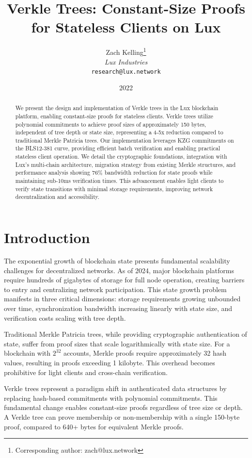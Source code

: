 \documentclass[11pt,a4paper]{article}
\title{\textbf{Verkle Trees: Constant-Size Proofs for Stateless Clients on Lux}}
\author{
Zach Kelling\thanks{Corresponding author: zach@lux.network}\\
\textit{Lux Industries}\\
\texttt{research@lux.network}
}
\date{2022}
\theoremstyle{definition}
\begin{document}
\luxcoverpage
\maketitle

\begin{abstract}
We present the design and implementation of Verkle trees in the Lux blockchain platform, enabling constant-size proofs for stateless clients. Verkle trees utilize polynomial commitments to achieve proof sizes of approximately 150 bytes, independent of tree depth or state size, representing a 4-5x reduction compared to traditional Merkle Patricia trees. Our implementation leverages KZG commitments on the BLS12-381 curve, providing efficient batch verification and enabling practical stateless client operation. We detail the cryptographic foundations, integration with Lux's multi-chain architecture, migration strategy from existing Merkle structures, and performance analysis showing 76\% bandwidth reduction for state proofs while maintaining sub-10ms verification times. This advancement enables light clients to verify state transitions with minimal storage requirements, improving network decentralization and accessibility.
\end{abstract}

\section{Introduction}

The exponential growth of blockchain state presents fundamental scalability challenges for decentralized networks. As of 2024, major blockchain platforms require hundreds of gigabytes of storage for full node operation, creating barriers to entry and centralizing network participation. This state growth problem manifests in three critical dimensions: storage requirements growing unbounded over time, synchronization bandwidth increasing linearly with state size, and verification costs scaling with tree depth.

Traditional Merkle Patricia trees, while providing cryptographic authentication of state, suffer from proof sizes that scale logarithmically with state size. For a blockchain with $2^{32}$ accounts, Merkle proofs require approximately 32 hash values, resulting in proofs exceeding 1 kilobyte. This overhead becomes prohibitive for light clients and cross-chain verification.

Verkle trees represent a paradigm shift in authenticated data structures by replacing hash-based commitments with polynomial commitments. This fundamental change enables constant-size proofs regardless of tree size or depth. A Verkle tree can prove membership or non-membership with a single 150-byte proof, compared to 640+ bytes for equivalent Merkle proofs.
\end{document}
